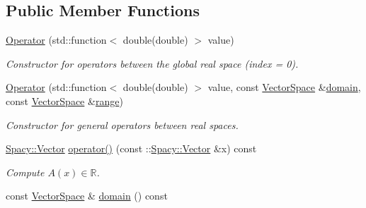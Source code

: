 \subsection*{Public Member Functions}
\begin{DoxyCompactItemize}
\item 
\hypertarget{classSpacy_1_1Scalar_1_1Operator_a5c46faf89dc8e9fb2df9a71ae158e77a}{\hyperlink{classSpacy_1_1Scalar_1_1Operator_a5c46faf89dc8e9fb2df9a71ae158e77a}{Operator} (std\-::function$<$ double(double) $>$ value)}\label{classSpacy_1_1Scalar_1_1Operator_a5c46faf89dc8e9fb2df9a71ae158e77a}

\begin{DoxyCompactList}\small\item\em Constructor for operators between the global real space (index = 0). \end{DoxyCompactList}\item 
\hypertarget{classSpacy_1_1Scalar_1_1Operator_a4d98b9954e5db4ba878d3f758e74d987}{\hyperlink{classSpacy_1_1Scalar_1_1Operator_a4d98b9954e5db4ba878d3f758e74d987}{Operator} (std\-::function$<$ double(double) $>$ value, const \hyperlink{classSpacy_1_1VectorSpace}{Vector\-Space} \&\hyperlink{classSpacy_1_1OperatorBase_a2588f9b3e0188820c4c494e63293dc6f}{domain}, const \hyperlink{classSpacy_1_1VectorSpace}{Vector\-Space} \&\hyperlink{classSpacy_1_1OperatorBase_ab19d3b7a6f290b1079248f1e567e53d6}{range})}\label{classSpacy_1_1Scalar_1_1Operator_a4d98b9954e5db4ba878d3f758e74d987}

\begin{DoxyCompactList}\small\item\em Constructor for general operators between real spaces. \end{DoxyCompactList}\item 
\hypertarget{classSpacy_1_1Scalar_1_1Operator_a087703405fdaeb5b395cf453ff0e9fa5}{\hyperlink{classSpacy_1_1Vector}{Spacy\-::\-Vector} \hyperlink{classSpacy_1_1Scalar_1_1Operator_a087703405fdaeb5b395cf453ff0e9fa5}{operator()} (const \-::\hyperlink{classSpacy_1_1Vector}{Spacy\-::\-Vector} \&x) const }\label{classSpacy_1_1Scalar_1_1Operator_a087703405fdaeb5b395cf453ff0e9fa5}

\begin{DoxyCompactList}\small\item\em Compute $A(x)\in\mathbb{R}$. \end{DoxyCompactList}\item 
\hypertarget{classSpacy_1_1OperatorBase_a2588f9b3e0188820c4c494e63293dc6f}{const \hyperlink{classSpacy_1_1VectorSpace}{Vector\-Space} \& \hyperlink{classSpacy_1_1OperatorBase_a2588f9b3e0188820c4c494e63293dc6f}{domain} () const }\label{classSpacy_1_1OperatorBase_a2588f9b3e0188820c4c494e63293dc6f}


\end{DoxyCompactItemize}
